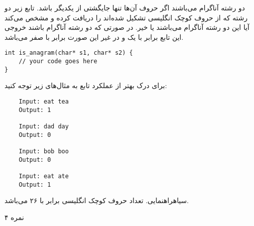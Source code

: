 
دو رشته آناگرام می‌باشند اگر حروف آن‌ها تنها جایگشتی از یکدیگر باشد.
تابع زیر دو رشته که از حروف کوچک انگلیسی تشکیل شده‌اند را دریافت کرده و مشخص می‌کند
آیا این دو رشته آناگرام می‌باشند یا خیر.
در صورتی که دو رشته آناگرام باشند خروجی این تابع برابر با یک و در غیر این صورت برابر با صفر می‌باشد.

\begin{latin}
\begin{verbatim}
int is_anagram(char* s1, char* s2) {
    // your code goes here
}
\end{verbatim}
\end{latin}

برای درک بهتر از عملکرد تابع به مثال‌های زیر توجه کنید:

\begin{latin}
\begin{verbatim}
    Input: eat tea
    Output: 1

    Input: dad day
    Output: 0

    Input: bob boo
    Output: 0

    Input: eat ate
    Output: 1
\end{verbatim}
\end{latin}

‌سیاه{راهنمایی.}
تعداد حروف کوچک انگلیسی برابر با ۲۶ می‌باشد.

۴ نمره
